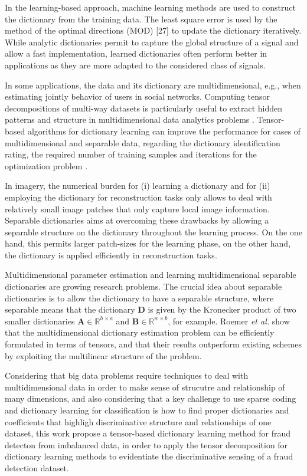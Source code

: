 In the learning-based approach, machine learning methods are used to construct the dictionary from the training data. The least square error is used by the method of the optimal directions (MOD) [27] to update the dictionary iteratively. While analytic dictionaries permit to capture the global structure of a signal and allow a fast implementation, learned dictionaries often perform better in applications as they are more adapted to the considered class of signals.

In some applications, the data and its dictionary are multidimensional, e.g., when estimating jointly behavior of users in social networks. Computing tensor decompositions of multi-way datasets is particularly useful to extract hidden patterns and structure in multidimensional data analytics problems \cite{kolda2009tensor}. Tensor-based algorithms for dictionary learning can improve the performance for cases of multidimensional and separable data, regarding the dictionary identification rating, the required number of training samples and iterations for the optimization problem \cite{roemer2014tensor}. 

In imagery, the numerical burden for (i) learning a dictionary and for (ii) employing the dictionary for reconstruction tasks only allows to deal with relatively small image patches that only capture local image information. Separable dictionaries aims at overcoming these drawbacks by allowing a separable structure on the dictionary throughout the learning process. On the one hand, this permits larger patch-sizes for the learning phase, on the other hand, the dictionary is applied efficiently in reconstruction tasks. 

Multidimensional parameter estimation and learning multidimensional separable dictionaries are growing research problems. The crucial idea about separable dictionaries is to allow the dictionary to have a separable structure, where separable means that the dictionary $\textbf{D}$ is given by the Kronecker product of two smaller dictionaries $\textbf{A} \in \mathbb{R}^{h \times a}$ and $\textbf{B} \in \mathbb{R}^{w \times b}$, for example. Roemer \emph{et al.} \cite{roemer2014tensor} show that the multidimensional dictionary estimation problem can be efficiently formulated in terms of tensors, and that their results outperform existing schemes by exploiting the multilinear structure of the problem.

Considering that big data problems require techniques to deal with multidimensional data in order to make sense of strucutre and relationship of many dimensions, and also considering that a key challenge to use sparse coding and dictionary learning for classification is how to find proper dictionaries and coefficients that highligh discriminative structure and relationships of one dataset, this work propose a tensor-based dictionary learning method for fraud detecton from imbalanced data, in order to apply the tensor deconposition for dictionary learning methods to evidentiate the discriminative sensing of a fraud detection dataset. 

